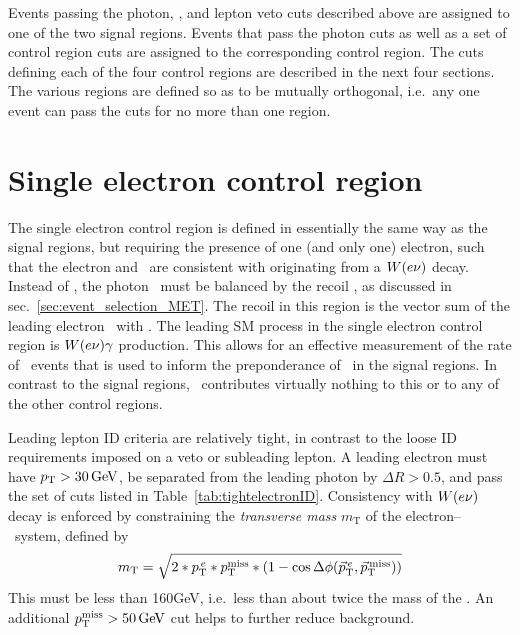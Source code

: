 Events passing the photon, \MET, and lepton veto cuts described above are assigned to one of the two signal regions. Events that pass the photon
cuts as well as a set of control region cuts are assigned to the corresponding control region. The cuts defining each of the four control regions
are described in the next four sections. The various regions are defined so as to be mutually orthogonal, i.e.\ any one event can pass the cuts
for no more than one region.

\section{Single electron control region} \label{sec:event_selection_monoele}
The single electron control region is defined in essentially the same way as the signal regions, but requiring the presence of one (and only one) electron,
such that the electron and \vecMET\ are consistent with originating from a $\PW(\Pe\Pn)$ decay.
Instead of \vecMET, the photon \vecpT\ must be balanced by the recoil \vecrecoil, as discussed in sec.~\ref{sec:event_selection_MET}. The recoil in this
region is the vector sum of the leading electron \pT\ with \vecMET.
The leading SM process in the single electron control region is $\PW(\Pe\Pn)\Pgamma$ production. This allows for an effective measurement of the rate of \wlng\ events
that is used to inform the preponderance of \wlng\ in the signal regions. In contrast to the signal regions, \zinvg\ contributes
virtually nothing to this or to any of the other control regions.

Leading lepton ID criteria are relatively tight, in contrast to the loose ID requirements imposed on a veto or subleading lepton. A leading electron must have $\pT > 30\unit{GeV}$,
be separated from the leading photon by $\Delta R > 0.5$, and pass the set of cuts listed in Table~\ref{tab:tightelectronID}.
Consistency with $\PW(\Pe\Pn)$ decay is enforced by constraining the \textit{transverse mass} $m_\mathrm{T}$ of the electron--\MET\ system, defined by
\begin{equation}
m_\mathrm{T} = \sqrt{2*\pT^{\,\Pe}*\MET*(1 - \cos{\Delta\phi(\vecpT^{\,\Pe}, \vecMET)})}
\label{eq:mT}
\end{equation}
This must be less than 160\unit{GeV}, i.e.\ less than about twice the mass of the \PW. An additional $\MET > 50\unit{GeV}$ cut helps to further reduce background.


